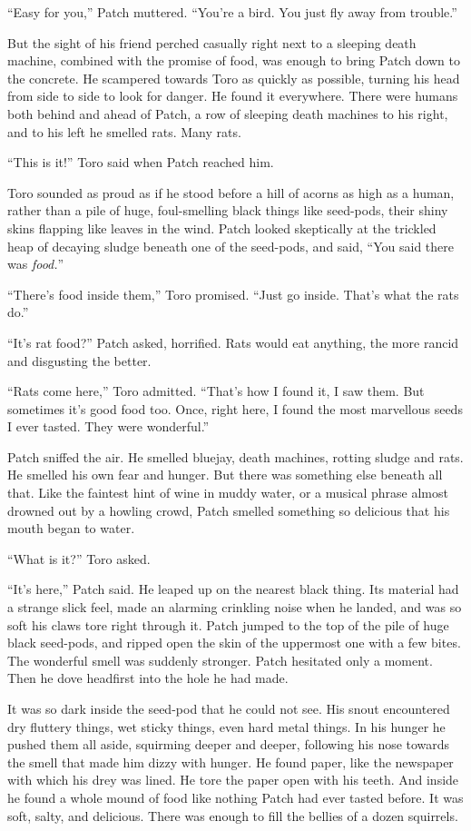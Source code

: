 \documentclass[ebook,oneside,openany,12pt]{memoir}
\begin{document}
“Easy for you,” Patch muttered. “You’re a bird. You just fly away from
trouble.”

But the sight of his friend perched casually right next to a sleeping
death machine, combined with the promise of food, was enough to bring
Patch down to the concrete. He scampered towards Toro as quickly as
possible, turning his head from side to side to look for danger. He
found it everywhere. There were humans both behind and ahead of Patch,
a row of sleeping death machines to his right, and to his left he
smelled rats. Many rats.

“This is it!” Toro said when Patch reached him.

Toro sounded as proud as if he stood before a hill of acorns as high
as a human, rather than a pile of huge, foul-smelling black things
like seed-pods, their shiny skins flapping like leaves in the
wind. Patch looked skeptically at the trickled heap of decaying sludge
beneath one of the seed-pods, and said, “You said there was
\emph{food.}”

“There’s food inside them,” Toro promised. “Just go inside. That’s
what the rats do.”

“It’s rat food?” Patch asked, horrified. Rats would eat anything, the
more rancid and disgusting the better.

“Rats come here,” Toro admitted. “That’s how I found it, I saw
them. But sometimes it’s good food too. Once, right here, I found the
most marvellous seeds I ever tasted. They were wonderful.”

Patch sniffed the air. He smelled bluejay, death machines, rotting
sludge and rats. He smelled his own fear and hunger. But there was
something else beneath all that. Like the faintest hint of wine in
muddy water, or a musical phrase almost drowned out by a howling
crowd, Patch smelled something so delicious that his mouth began to
water.

“What is it?” Toro asked.

“It’s here,” Patch said. He leaped up on the nearest black thing. Its
material had a strange slick feel, made an alarming crinkling noise
when he landed, and was so soft his claws tore right through it. Patch
jumped to the top of the pile of huge black seed-pods, and ripped open
the skin of the uppermost one with a few bites. The wonderful smell
was suddenly stronger. Patch hesitated only a moment. Then he dove
headfirst into the hole he had made.

It was so dark inside the seed-pod that he could not see. His snout
encountered dry fluttery things, wet sticky things, even hard metal
things. In his hunger he pushed them all aside, squirming deeper and
deeper, following his nose towards the smell that made him dizzy with
hunger. He found paper, like the newspaper with which his drey was
lined. He tore the paper open with his teeth. And inside he found a
whole mound of food like nothing Patch had ever tasted before. It was
soft, salty, and delicious. There was enough to fill the bellies of a
dozen squirrels.
\end{document}
